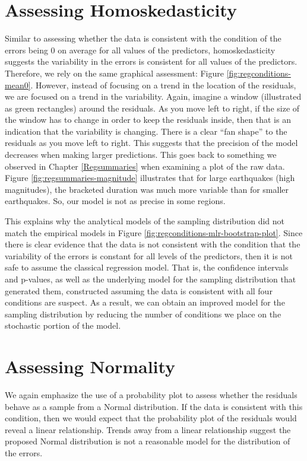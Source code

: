\documentclass[]{book}
\theoremstyle{definition}
\theoremstyle{definition}
\theoremstyle{definition}
\theoremstyle{remark}
\begin{document}
\section{Assessing Homoskedasticity}\label{assessing-homoskedasticity-1}

Similar to assessing whether the data is consistent with the condition
of the errors being 0 on average for all values of the predictors,
homoskedasticity suggests the variability in the errors is consistent
for all values of the predictors. Therefore, we rely on the same
graphical assessment: Figure \ref{fig:regconditions-mean0}. However,
instead of focusing on a trend in the location of the residuals, we are
focused on a trend in the variability. Again, imagine a window
(illustrated as green rectangles) around the residuals. As you move left
to right, if the size of the window has to change in order to keep the
residuals inside, then that is an indication that the variability is
changing. There is a clear ``fan shape'' to the residuals as you move
left to right. This suggests that the precision of the model decreases
when making larger predictions. This goes back to something we observed
in Chapter \ref{Regsummaries} when examining a plot of the raw data.
Figure \ref{fig:regsummaries-magnitude} illustrates that for large
earthquakes (high magnitudes), the bracketed duration was much more
variable than for smaller earthquakes. So, our model is not as precise
in some regions.

This explains why the analytical models of the sampling distribution did
not match the empirical models in Figure
\ref{fig:regconditions-mlr-bootstrap-plot}. Since there is clear
evidence that the data is not consistent with the condition that the
variability of the errors is constant for all levels of the predictors,
then it is not safe to assume the classical regression model. That is,
the confidence intervals and p-values, as well as the underlying model
for the sampling distribution that generated them, constructed assuming
the data is consistent with all four conditions are suspect. As a
result, we can obtain an improved model for the sampling distribution by
reducing the number of conditions we place on the stochastic portion of
the model.

\section{Assessing Normality}\label{assessing-normality-1}

We again emphasize the use of a probability plot to assess whether the
residuals behave as a sample from a Normal distribution. If the data is
consistent with this condition, then we would expect that the
probability plot of the residuals would reveal a linear relationship.
Trends away from a linear relationship suggest the proposed Normal
distribution is not a reasonable model for the distribution of the
errors.
\end{document}

